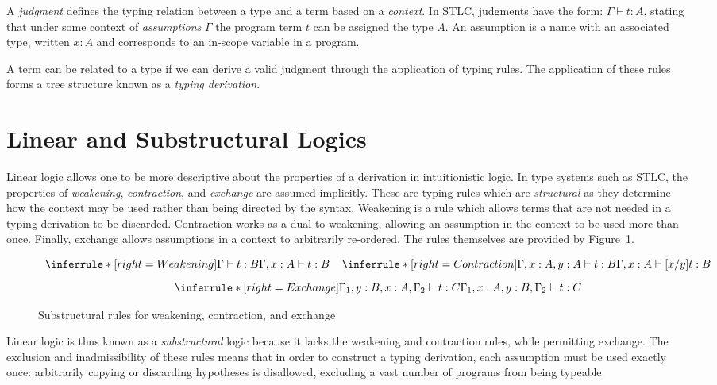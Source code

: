 A \textit{judgment} defines the typing relation between a type and a term based on a
\textit{context}. In STLC, judgments have the
form: $\Gamma \vdash t : A$, stating that under some context of
\textit{assumptions} $\Gamma$ the program term $t$ can be assigned the type $A$.
An assumption is a name with an associated type, written $x : A$ and
corresponds to an in-scope variable in a program.

A term can be related to a type if we can derive a valid judgment through the
application of typing rules. The application of these rules forms a tree
structure known as a \textit{typing derivation}.

\section{Linear and Substructural Logics}
Linear logic allows one to be more descriptive about the properties of a
derivation in intuitionistic logic. In type systems such as STLC, the properties
of \textit{weakening}, \textit{contraction}, and \textit{exchange} are assumed
implicitly. These are typing rules which are \textit{structural} as they
determine how the context may be used rather than being directed by the syntax.
Weakening is a rule which allows terms that are not needed in a typing
derivation to be discarded. Contraction works as a dual to weakening, allowing
an assumption in the context to be used more than once. Finally, exchange allows
assumptions in a context to arbitrarily re-ordered. The rules themselves are
provided by Figure~\ref{fig:substructural}.

\begin{figure}[H]
  \begin{gather*}
  \begin{array}{c}
    \inferrule*[right=Weakening]{\Gamma \vdash t : B}{\Gamma, x : A \vdash t : B}
    \;\;\;\;
    \inferrule*[right=Contraction]{\Gamma, x : A, y : A \vdash t : B}{\Gamma, x : A \vdash [x/y] t : B}
    \\[0.9em]
    \inferrule*[right=Exchange]{\Gamma_{1}, y : B, x : A, \Gamma_{2} \vdash t : C} {\Gamma_{1}, x : A, y : B, \Gamma_{2} \vdash t : C}
    \end{array}
  \end{gather*}
  \caption{Substructural rules for weakening, contraction, and exchange}
  \label{fig:substructural}
\end{figure}

Linear logic is thus known as a \textit{substructural} logic because it lacks
the weakening and contraction rules, while permitting exchange. The exclusion
and inadmissibility of these rules means that in order to construct a typing
derivation, each assumption must be used exactly once: arbitrarily copying or
discarding hypotheses is disallowed, excluding a vast number of programs from being
typeable. 

